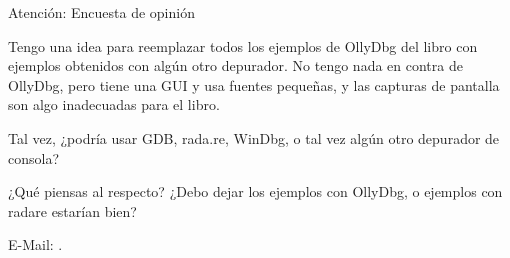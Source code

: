 \bigskip
\bigskip
\bigskip

\huge Atención: Encuesta de opinión
\normalsize

\bigskip
\bigskip
\bigskip

Tengo una idea para reemplazar todos los ejemplos de OllyDbg del libro con ejemplos obtenidos con algún otro depurador.
No tengo nada en contra de OllyDbg, pero tiene una GUI y usa fuentes pequeñas, y las capturas de pantalla son algo inadecuadas para el libro.

Tal vez, ¿podría usar GDB, rada.re, WinDbg, o tal vez algún otro depurador de consola?

¿Qué piensas al respecto?
¿Debo dejar los ejemplos con OllyDbg, o ejemplos con radare estarían bien?

E-Mail: \GTT{\EMAIL}.

\vspace*{\fill}
\vfill
